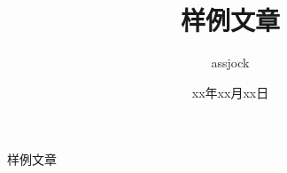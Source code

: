 \documentclass[]{article}
\title{样例文章}
\author{assjock}
\date{xx年xx月xx日}
\begin{document}
\maketitle
\begin{center}
样例文章 
\end{center}
    
\end{document}
